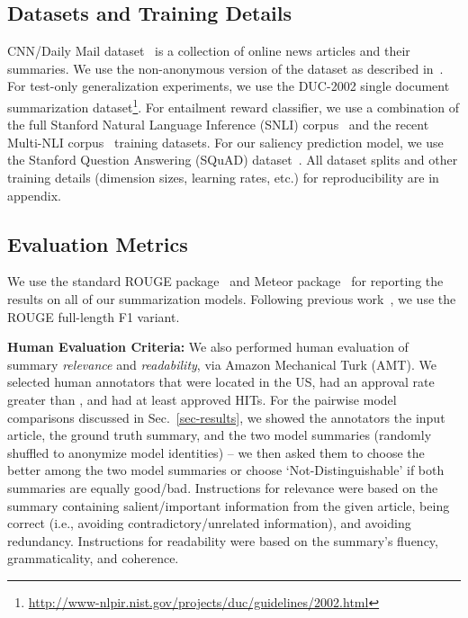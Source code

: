 \documentclass[11pt,a4paper]{article}
\begin{document}
\subsection{Datasets and Training Details}
\label{subsec:datasets}
CNN/Daily Mail dataset~\cite{hermann2015teaching,nallapati2016abstractive} is a collection of online news articles and their summaries. We use the non-anonymous version of the dataset as described in~. For test-only generalization experiments, we use the DUC-2002 single document summarization dataset\footnote{\scriptsize{\url{http://www-nlpir.nist.gov/projects/duc/guidelines/2002.html}}}.
For entailment reward classifier, we use a combination of the full Stanford Natural Language Inference (SNLI) corpus~\cite{bowman2015large} and the recent Multi-NLI corpus~\cite{williams2017broad} training datasets.
For our saliency prediction model, we use the Stanford Question Answering (SQuAD) dataset~\cite{rajpurkar2016squad}. All dataset splits and other training details (dimension sizes, learning rates, etc.) for reproducibility are in appendix.

\subsection{Evaluation Metrics}
\label{subsec:evaluation-metrics}
We use the standard ROUGE package~\cite{lin2004rouge} and Meteor package~\cite{banerjee2005meteor} for reporting the results on all of our summarization models. Following previous work~\cite{chopra2016abstractive,nallapati2016abstractive,see2017get}, we use the ROUGE full-length F1 variant.

\noindent\textbf{Human Evaluation Criteria:}
We also performed human evaluation of summary \emph{relevance} and \emph{readability}, via Amazon Mechanical Turk (AMT). We selected human annotators that were located in the US, had an approval rate greater than , and had at least  approved HITs. For the pairwise model comparisons discussed in Sec.~\ref{sec-results}, we showed the annotators the input article, the ground truth summary, and the two model summaries (randomly shuffled to anonymize model identities) -- we then asked them to choose the better among the two model summaries or choose `Not-Distinguishable' if both summaries are equally good/bad. Instructions for relevance were based on the summary containing salient/important information from the given article, being correct (i.e., avoiding contradictory/unrelated information), and avoiding redundancy. Instructions for readability were based on the summary's fluency, grammaticality, and coherence.
\end{document}
